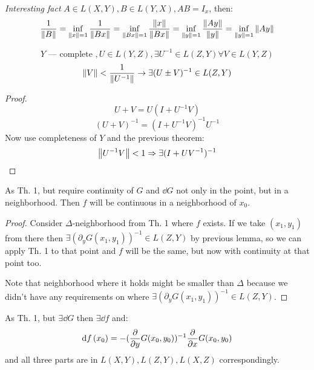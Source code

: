 \textit{Interesting fact} $A \in L(X, Y), B \in L(Y, X), AB = I_x$, then:
\[ \frac{1}{\norm{B}} = \inf\limits_{\norm{x}=1} \frac{1}{\norm{Bx}} = 
 \inf\limits_{\norm{Bx} = 1} \frac{\norm{x}}{\norm{Bx}} = 
\inf\limits_{\norm{y}=1} \frac{\norm{Ay}}{\norm{y}} = \inf\limits_{\norm{y}=1} \norm{Ay} \]

\begin{thr} 
    \[ Y\text{ --- complete }, U \in L(Y, Z), \exists U^{-1} \in L(Z, Y) \forall V \in L(Y, Z) \] 
    \[ \norm{V} < \dfrac{1}{\norm{U^{-1}}} \to \exists (U \pm V)^{-1} \in L(Z, Y) \]
\end{thr}
\begin{proof}
    \[U + V = U(I + U^{-1}V)\]
    \[(U+V)^{-1} = (I +  U^{-1}V)^{-1} U^{-1}\]
    Now use completeness of $Y$ and the previous theorem:
    \[\norm{U^{-1}V} < 1 \Rightarrow \exists (I + UV^{-1})^{-1}\]
\end{proof}

\begin{thr}
    As Th. 1, but require continuity of $G$ and $\dd{G}$ not only in the point,
    but in a neighborhood. Then $f$ will be continuous in a neighborhood of $x_0$.
\end{thr}

\begin{proof}
    Consider $\Delta$-neighborhood from Th. 1 where $f$ exists. 
    If we take $(x_1, y_1)$  from there then
     $\exists (\partial_y G(x_1, y_1))^{-1} \in L(Z, Y)$ by previous lemma, so 
     we can apply Th. 1 to that point and $f$ will be the same, but now with 
     continuity at that point too.

     Note that neighborhood where it holds might be smaller than $\Delta$ because 
     we didn't have any requirements on where $\exists (\partial_y G(x_1, y_1))^{-1} \in L(Z, Y)$.
\end{proof}

\begin{thr}
    As Th. 1, but $\exists \dd{G}$ then $\exists \dd{f}$ and:
    \[ \dd{f}\/(x_0) = -(\pdv{y} G(x_0, y_0))^{-1}\pdv{x}G(x_0, y_0) \] 
    and all three parts are in $L(X, Y), L(Z, Y), L(X, Z)$ correspondingly.
\end{thr}

